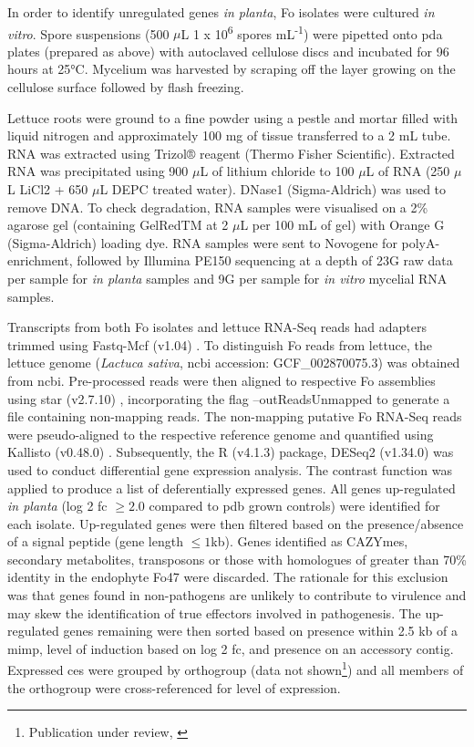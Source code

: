 In order to identify unregulated genes \textit{in planta}, \ac{Fo} isolates were cultured \textit{in vitro}. Spore suspensions (500 \(\mu\)L 1 x 10\textsuperscript{6} spores mL\textsuperscript{-1}) were pipetted onto \ac{pda} plates (prepared as above) with autoclaved cellulose discs and incubated for 96 hours at 25°C. Mycelium was harvested by scraping off the layer growing on the cellulose surface followed by flash freezing. 

Lettuce roots were ground to a fine powder using a pestle and mortar filled with liquid nitrogen and approximately 100 mg of tissue transferred to a 2 mL tube. RNA was extracted using Trizol® reagent (Thermo Fisher Scientific). Extracted RNA was precipitated using 900 \(\mu\)L of lithium chloride to 100 \(\mu\)L of RNA (250 \(\mu\)L LiCl2 + 650 \(\mu\)L DEPC treated water). DNase1 (Sigma-Aldrich) was used to remove DNA. To check degradation, RNA samples were visualised on a 2\% agarose gel (containing GelRedTM at 2 \(\mu\)L per 100 mL of gel) with Orange G (Sigma-Aldrich) loading dye. RNA samples were sent to  Novogene for polyA-enrichment, followed by Illumina PE150 sequencing at a depth of 23G raw data per sample for \textit{in planta} samples and 9G per sample for \textit{in vitro} mycelial RNA samples.

Transcripts from both \ac{Fo} isolates and lettuce RNA-Seq reads had adapters trimmed using Fastq-Mcf (v1.04) \parencite{Aronesty2013}. To distinguish \ac{Fo} reads from lettuce, the lettuce genome (\textit{Lactuca sativa}, \ac{ncbi} accession: GCF\_002870075.3) was obtained from \ac{ncbi}. Pre-processed reads were then aligned to respective \ac{Fo} assemblies using \ac{star} (v2.7.10) \parencite{Dobin2013}, incorporating the flag --outReadsUnmapped to generate a file containing non-mapping reads. The non-mapping putative \ac{Fo} RNA-Seq reads were pseudo-aligned to the respective reference genome and quantified using Kallisto (v0.48.0) \parencite{Bray2016}. Subsequently, the R (v4.1.3) \parencite{R} package, DESeq2 (v1.34.0) \parencite{Love2014} was used to conduct differential gene expression analysis. The contrast function was applied to produce a list of deferentially expressed genes. All genes up-regulated \textit{in planta} (log 2 \ac{fc} $\ge2.0$ compared to \ac{pdb} grown controls) were identified for each isolate. Up-regulated genes were then filtered based on the presence/absence of a signal peptide (gene length $\le1$kb). Genes identified as CAZYmes, secondary metabolites, transposons or those with homologues of greater than 70\% identity in the endophyte Fo47 were discarded. The rationale for this exclusion was that genes found in non-pathogens are unlikely to contribute to virulence and may skew the identification of true effectors involved in pathogenesis. The up-regulated genes remaining were then sorted based on presence within 2.5 kb of a \ac{mimp}, level of induction based on log 2 \ac{fc}, and presence on an accessory contig. Expressed \acp{ce} were grouped by orthogroup (data not shown\footnote{Publication under review, \textcite{FolaManuscript}}) and all members of the orthogroup were cross-referenced for level of expression. 

